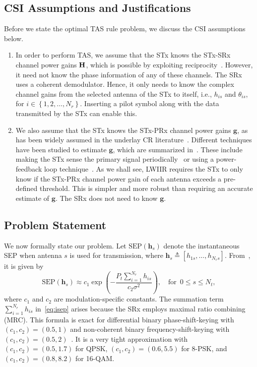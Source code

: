 \documentclass[12pt,draftcls,peerreview,onecolumn]{IEEEtran}
\newcommand{\define}{\triangleq}
\newcommand{\ie}{{i.e.}}
\newcommand{\mtx}[1]{{\bf #1}} %
\newcommand{\SEP}{\text{SEP}}
\newcommand{\Nt}{{N_t}}
\newcommand{\Nr}{{N_r}}
\newcommand{\Pt}{{P_t}}
\newcommand{\such}{h}
\newcommand{\puch}{g}
\newcommand{\hk}[1]{{\such_{#1}}}
\newcommand{\g}{\mathbf{\puch}}
\newcommand{\noisevar}{\sigma^2}
\newcommand{\cone}{c_{1}}
\newcommand{\ctwo}{c_{2}}
\newcommand{\nropts}{\left\{1,2,\ldots,\Nr\right\}}
\newcommand{\suchph}{\theta}
\newcommand{\thetahk}{\suchph_{is}}
\newcommand{\Hmx}{\mtx{H}}
\newcommand{\sumnr}{\sum_{i=1}^{\Nr}}
\newcommand{\hs}{\mathbf{\such}_{s}}
\begin{document}
\subsection{CSI Assumptions and Justifications}  
Before we state the optimal TAS rule problem, we discuss the  CSI assumptions below. 
\begin{enumerate}
\item In order to perform TAS, we assume that the STx knows the STx-SRx channel power gains $\Hmx$, which is possible by exploiting reciprocity~\cite{Hanif_2015_globecom,Sarvendranath_2013_TCOM,Wang_2010_TWC,RZhang_2009_TWC,Sarvendranath_2014_TCOM}. However, it need not know the phase information of any of these channels. The SRx uses a coherent demodulator. Hence, it only needs to know the complex channel gains from the selected antenna of the STx to itself, \ie, $\hk{is}$ and $\thetahk$, for $i\in\nropts$. Inserting a pilot symbol along with the data transmitted by the STx can enable this.  

\item We also assume that the STx knows the STx-PRx channel power gains $\g$, as has been widely assumed in the underlay CR literature~\cite{Hanif_2015_globecom,Sarvendranath_2013_TCOM,Sarvendranath_2014_TCOM,Kong_2011_JCN,Wang_2010_TWC,RZhang_2009_TWC}. Different techniques have been studied to estimate  $\g$, which are summarized in~\cite{Zhang_2017_tcom}. These include making the STx sense the primary signal periodically~\cite{Zhao_2008_TSP} or using a power-feedback loop technique~\cite{RZhang_2008_DSAN}. As we shall see, LWIIR  requires the STx to only know if the STx-PRx channel power gain of each antenna exceeds a pre-defined threshold. This is simpler and more robust than requiring an accurate estimate of $\g$. The SRx does not need to know $\g$. 

\end{enumerate}

\subsection{Problem Statement}
We now formally state our problem. Let $\SEP(\hs)$ denote the instantaneous SEP when antenna $s$ is used for transmission, where $\hs\define\left[\hk{1s},\ldots,\hk{\Nr s} \right]$. From~\cite[(14)]{Chung_2001_TCom}, it is given by  
\begin{equation}
\SEP(\hs) \approx \cone \exp\left({-\frac{\Pt\sumnr\hk{is}}{\ctwo\noisevar} }\right), \quad\text{for} \,\,\, 0\leq s \leq \Nt,
\label{eq:isep}
\end{equation} 
where $\cone$ and $\ctwo$ are modulation-specific constants. The summation term $\sumnr\hk{is}$ in~\eqref{eq:isep} arises because the SRx employs maximal ratio combining (MRC). This formula is exact for differential binary phase-shift-keying  with $(\cone,\ctwo) = (0.5,1)$  and non-coherent binary frequency-shift-keying  with  $(\cone,\ctwo) = (0.5,2)$~\cite{Fakhan_2014_TSP}. It is a very tight approximation with $(\cone,\ctwo)=(0.5,1.7)$ for QPSK,  $(\cone,\ctwo)=(0.6,5.5)$ for 8-PSK, and  $(\cone,\ctwo )=(0.8,8.2)$ for 16-QAM. %
\end{document}
